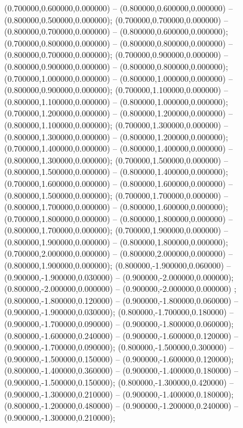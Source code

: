  (0.700000,0.600000,0.000000) -- (0.800000,0.600000,0.000000) -- (0.800000,0.500000,0.000000);
 (0.700000,0.700000,0.000000) -- (0.800000,0.700000,0.000000) -- (0.800000,0.600000,0.000000);
 (0.700000,0.800000,0.000000) -- (0.800000,0.800000,0.000000) -- (0.800000,0.700000,0.000000);
 (0.700000,0.900000,0.000000) -- (0.800000,0.900000,0.000000) -- (0.800000,0.800000,0.000000);
 (0.700000,1.000000,0.000000) -- (0.800000,1.000000,0.000000) -- (0.800000,0.900000,0.000000);
 (0.700000,1.100000,0.000000) -- (0.800000,1.100000,0.000000) -- (0.800000,1.000000,0.000000);
 (0.700000,1.200000,0.000000) -- (0.800000,1.200000,0.000000) -- (0.800000,1.100000,0.000000);
 (0.700000,1.300000,0.000000) -- (0.800000,1.300000,0.000000) -- (0.800000,1.200000,0.000000);
 (0.700000,1.400000,0.000000) -- (0.800000,1.400000,0.000000) -- (0.800000,1.300000,0.000000);
 (0.700000,1.500000,0.000000) -- (0.800000,1.500000,0.000000) -- (0.800000,1.400000,0.000000);
 (0.700000,1.600000,0.000000) -- (0.800000,1.600000,0.000000) -- (0.800000,1.500000,0.000000);
 (0.700000,1.700000,0.000000) -- (0.800000,1.700000,0.000000) -- (0.800000,1.600000,0.000000);
 (0.700000,1.800000,0.000000) -- (0.800000,1.800000,0.000000) -- (0.800000,1.700000,0.000000);
 (0.700000,1.900000,0.000000) -- (0.800000,1.900000,0.000000) -- (0.800000,1.800000,0.000000);
 (0.700000,2.000000,0.000000) -- (0.800000,2.000000,0.000000) -- (0.800000,1.900000,0.000000);
 (0.800000,-1.900000,0.060000) -- (0.900000,-1.900000,0.030000) -- (0.900000,-2.000000,0.000000);
 (0.800000,-2.000000,0.000000) -- (0.900000,-2.000000,0.000000) ;
 (0.800000,-1.800000,0.120000) -- (0.900000,-1.800000,0.060000) -- (0.900000,-1.900000,0.030000);
 (0.800000,-1.700000,0.180000) -- (0.900000,-1.700000,0.090000) -- (0.900000,-1.800000,0.060000);
 (0.800000,-1.600000,0.240000) -- (0.900000,-1.600000,0.120000) -- (0.900000,-1.700000,0.090000);
 (0.800000,-1.500000,0.300000) -- (0.900000,-1.500000,0.150000) -- (0.900000,-1.600000,0.120000);
 (0.800000,-1.400000,0.360000) -- (0.900000,-1.400000,0.180000) -- (0.900000,-1.500000,0.150000);
 (0.800000,-1.300000,0.420000) -- (0.900000,-1.300000,0.210000) -- (0.900000,-1.400000,0.180000);
 (0.800000,-1.200000,0.480000) -- (0.900000,-1.200000,0.240000) -- (0.900000,-1.300000,0.210000);
